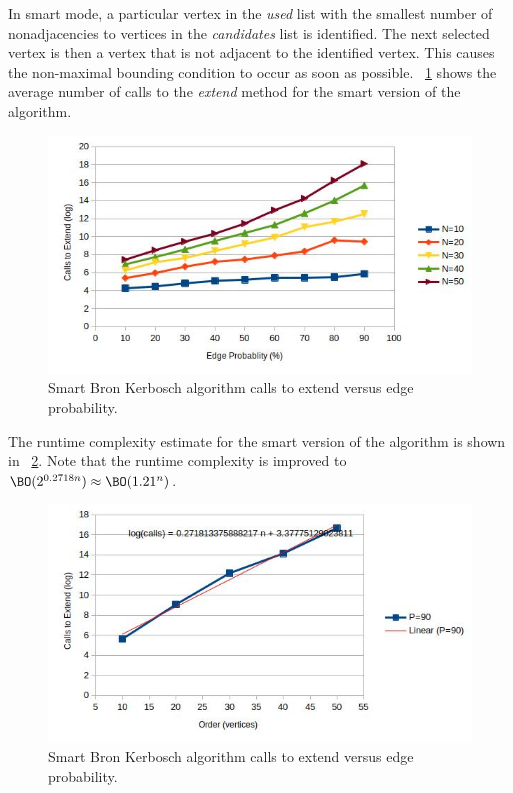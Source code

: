 In smart mode, a particular vertex in the \emph{used} list with the smallest number of nonadjacencies to vertices
in the \emph{candidates} list is identified.  The next selected vertex is then a vertex that is not adjacent to the
identified vertex.  This causes the non-maximal bounding condition to occur as soon as possible.
\figurename~\ref{fig:bron2:calls} shows the average number of calls to the \emph{extend} method for the smart
version of the algorithm.

\begin{figure}[H]
  \centering
  \includegraphics[width=5in]{bron1_calls}
  \caption{Smart Bron Kerbosch algorithm calls to extend versus edge probability.}
  \label{fig:bron2:calls}
\end{figure}

The runtime complexity estimate for the smart version of the algorithm is shown in
\figurename~\ref{fig:bron2:runtime}.  Note that the runtime complexity is improved to
\(\BO(2^{0.2718n})\approx\BO(1.21^n)\).

\begin{figure}[H]
  \centering
  \includegraphics[width=5in]{bron2_runtime}
  \caption{Smart Bron Kerbosch algorithm calls to extend versus edge probability.}
  \label{fig:bron2:runtime}
\end{figure}

